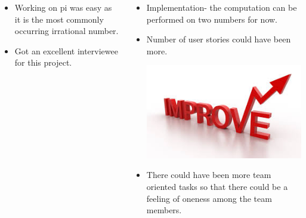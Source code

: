 \documentclass[20pt,margin=1in,innermargin=-4.5in,blockverticalspace=-0.25in]{tikzposter}
\begin{document}
\begin{columns}
{\begin{itemize}
        \item Working on pi was easy as it is the most commonly occurring irrational number.
        \item Got an excellent interviewee for this project.
    \end{itemize}
    \vspace{2cm}
   }
    {
    \vspace{0.5cm}
        \begin{itemize}
            \item Implementation- the computation can be performed on two numbers for now.
            \item Number of user stories could have been more.
            \begin{tikzfigure}
            \includegraphics[width=0.28\linewidth]{improve.jpg}
        \end{tikzfigure}
            \item There could have been more team oriented tasks so that there could be a feeling of oneness among the team members.

\end{itemize}}
\end{columns}
\end{document}
